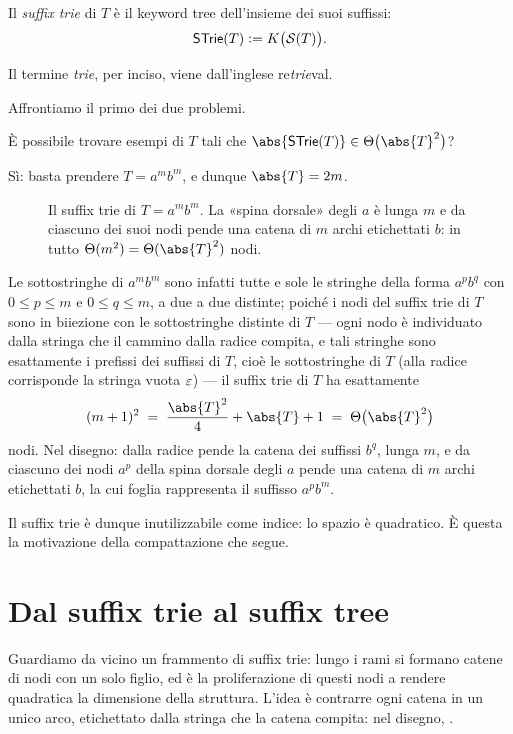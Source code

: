 \begin{definizione}\label{def:strie}
Il \emph{suffix trie} di $T$ è il keyword tree dell'insieme dei suoi suffissi:
\[
  \textsf{STrie}{}(T) \vcentcolon= K\bigl(\mathcal{S}(T)\bigr).
\]
\end{definizione}

Il termine \emph{trie}, per inciso, viene dall'inglese re\emph{trie}val.

Affrontiamo il primo dei due problemi.

\begin{domanda}
È possibile trovare esempi di $T$ tali che $\abs{\STrie{}(T)} \in \Th\bigl(\abs{T}^2\bigr)$?
\end{domanda}

Sì: basta prendere $T = a^m b^m$, e dunque $\abs{T} = 2m$.

\begin{figure}[H]
\centering

\caption{Il suffix trie di $T = a^m b^m$. La «spina dorsale» degli $a$ è lunga $m$ e da
ciascuno dei suoi nodi pende una catena di $m$ archi etichettati $b$: in tutto
$\Th(m^2) = \Th(\abs{T}^2)$ nodi.}
\label{fig:suffix-trie-ambm}
\end{figure}

Le sottostringhe di $a^m b^m$ sono infatti tutte e sole le stringhe della forma $a^p b^q$ con
$0 \le p \le m$ e $0 \le q \le m$, a due a due distinte; poiché i nodi del suffix trie di $T$
sono in biiezione con le sottostringhe distinte di $T$ --- ogni nodo è individuato dalla
stringa che il cammino dalla radice compita, e tali stringhe sono esattamente i prefissi dei
suffissi di $T$, cioè le sottostringhe di $T$ (alla radice corrisponde la stringa vuota
$\varepsilon$) --- il suffix trie di $T$ ha esattamente
\[
  (m+1)^2 \;=\; \frac{\abs{T}^2}{4} + \abs{T} + 1 \;=\; \Th\bigl(\abs{T}^2\bigr)
\]
nodi. Nel disegno: dalla radice pende la catena dei suffissi $b^q$, lunga $m$, e da ciascuno
dei nodi $a^p$ della spina dorsale degli $a$ pende una catena di $m$ archi etichettati $b$,
la cui foglia rappresenta il suffisso $a^p b^m$.

Il suffix trie è dunque inutilizzabile come indice: lo spazio è quadratico. È questa la
motivazione della compattazione che segue.

\section{Dal suffix trie al suffix tree}

Guardiamo da vicino un frammento di suffix trie: lungo i rami si formano catene di nodi con
un solo figlio, ed è la proliferazione di questi nodi a rendere quadratica la dimensione
della struttura. L'idea è contrarre ogni catena in un unico arco, etichettato dalla stringa
che la catena compita: nel disegno, .

